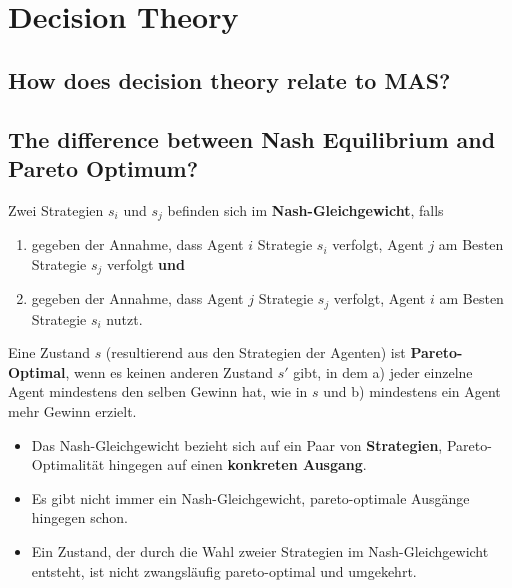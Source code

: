 \section{Decision Theory}
\subsection{How does decision theory relate to MAS?}
\subsection{The difference between Nash Equilibrium and Pareto Optimum?}
Zwei Strategien $s_i$ und $s_j$ befinden sich im \textbf{Nash-Gleichgewicht}, falls
\begin{enumerate}
	\item gegeben der Annahme, dass Agent $i$ Strategie $s_i$ verfolgt, Agent $j$ am Besten Strategie $s_j$ verfolgt \textbf{und}
	\item gegeben der Annahme, dass Agent $j$ Strategie $s_j$ verfolgt, Agent $i$ am Besten Strategie $s_i$ nutzt.
\end{enumerate}
Eine Zustand $s$ (resultierend aus den Strategien der Agenten) ist \textbf{Pareto-Optimal}, wenn es keinen anderen Zustand $s'$ gibt, in dem a) jeder einzelne Agent mindestens den selben Gewinn hat, wie in $s$ und b) mindestens ein Agent mehr Gewinn erzielt. 

\begin{itemize}
	\item Das Nash-Gleichgewicht bezieht sich auf ein Paar von \textbf{Strategien}, Pareto-Optimalität hingegen auf einen \textbf{konkreten Ausgang}.
	\item Es gibt nicht immer ein Nash-Gleichgewicht, pareto-optimale Ausgänge hingegen schon.
	\item Ein Zustand, der durch die Wahl zweier Strategien im Nash-Gleichgewicht entsteht, ist nicht zwangsläufig pareto-optimal und umgekehrt. 
\end{itemize}
